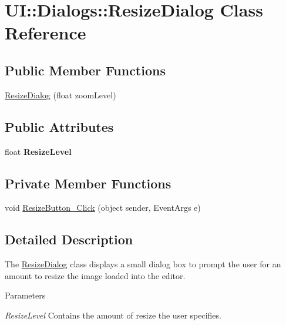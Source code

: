 \hypertarget{class_u_i_1_1_dialogs_1_1_resize_dialog}{
\section{UI::Dialogs::ResizeDialog Class Reference}
\label{class_u_i_1_1_dialogs_1_1_resize_dialog}
}
\subsection*{Public Member Functions}
\begin{DoxyCompactItemize}
\item 
\hyperlink{class_u_i_1_1_dialogs_1_1_resize_dialog_affb5991256fd1dd4347433f8a0ce4134}{ResizeDialog} (float zoomLevel)
\end{DoxyCompactItemize}
\subsection*{Public Attributes}
\begin{DoxyCompactItemize}
\item 
\hypertarget{class_u_i_1_1_dialogs_1_1_resize_dialog_ad07618f30af6afd003833ebee72c69cb}{
float {\bfseries ResizeLevel}}
\label{class_u_i_1_1_dialogs_1_1_resize_dialog_ad07618f30af6afd003833ebee72c69cb}

\end{DoxyCompactItemize}
\subsection*{Private Member Functions}
\begin{DoxyCompactItemize}
\item 
void \hyperlink{class_u_i_1_1_dialogs_1_1_resize_dialog_a4f6039a9f2ecb98483c75d5f050fb2e4}{ResizeButton\_\-Click} (object sender, EventArgs e)
\end{DoxyCompactItemize}


\subsection{Detailed Description}
The \hyperlink{class_u_i_1_1_dialogs_1_1_resize_dialog}{ResizeDialog} class displays a small dialog box to prompt the user for an amount to resize the image loaded into the editor.


\begin{DoxyParams}{Parameters}
\item[{\em ResizeLevel}]Contains the amount of resize the user specifies. \end{DoxyParams}


